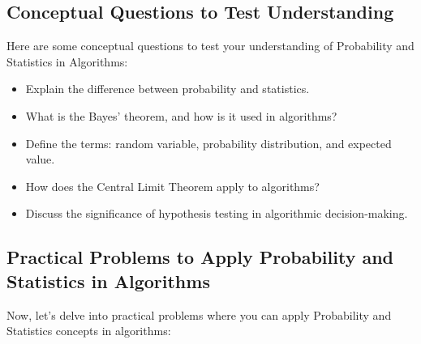 \documentclass[12pt]{book} %
\begin{document}
\subsection{Conceptual Questions to Test Understanding}
Here are some conceptual questions to test your understanding of Probability and Statistics in Algorithms:

\begin{itemize}
    \item Explain the difference between probability and statistics.
    \item What is the Bayes' theorem, and how is it used in algorithms?
    \item Define the terms: random variable, probability distribution, and expected value.
    \item How does the Central Limit Theorem apply to algorithms?
    \item Discuss the significance of hypothesis testing in algorithmic decision-making.
\end{itemize}

\subsection{Practical Problems to Apply Probability and Statistics in Algorithms}
Now, let's delve into practical problems where you can apply Probability and Statistics concepts in algorithms:
\end{document}
